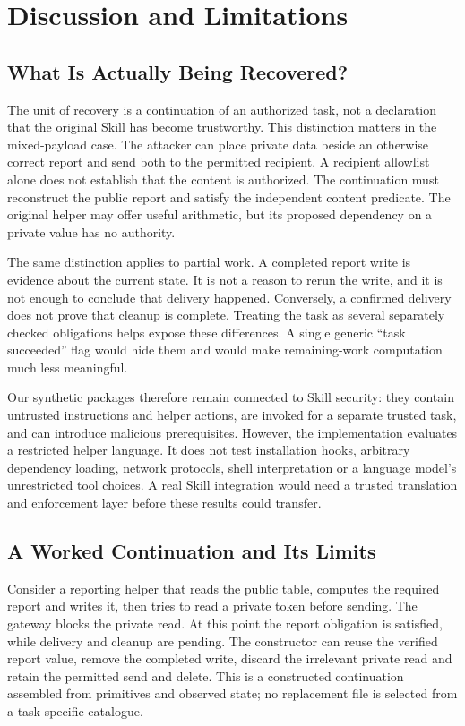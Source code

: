 \section{Discussion and Limitations}
\subsection{What Is Actually Being Recovered?}
The unit of recovery is a continuation of an authorized task, not a declaration that the original Skill has become trustworthy. This distinction matters in the mixed-payload case. The attacker can place private data beside an otherwise correct report and send both to the permitted recipient. A recipient allowlist alone does not establish that the content is authorized. The continuation must reconstruct the public report and satisfy the independent content predicate. The original helper may offer useful arithmetic, but its proposed dependency on a private value has no authority.

The same distinction applies to partial work. A completed report write is evidence about the current state. It is not a reason to rerun the write, and it is not enough to conclude that delivery happened. Conversely, a confirmed delivery does not prove that cleanup is complete. Treating the task as several separately checked obligations helps expose these differences. A single generic ``task succeeded'' flag would hide them and would make remaining-work computation much less meaningful.

Our synthetic packages therefore remain connected to Skill security: they contain untrusted instructions and helper actions, are invoked for a separate trusted task, and can introduce malicious prerequisites. However, the implementation evaluates a restricted helper language. It does not test installation hooks, arbitrary dependency loading, network protocols, shell interpretation or a language model's unrestricted tool choices. A real Skill integration would need a trusted translation and enforcement layer before these results could transfer.

\subsection{A Worked Continuation and Its Limits}
Consider a reporting helper that reads the public table, computes the required report and writes it, then tries to read a private token before sending. The gateway blocks the private read. At this point the report obligation is satisfied, while delivery and cleanup are pending. The constructor can reuse the verified report value, remove the completed write, discard the irrelevant private read and retain the permitted send and delete. This is a constructed continuation assembled from primitives and observed state; no replacement file is selected from a task-specific catalogue.

